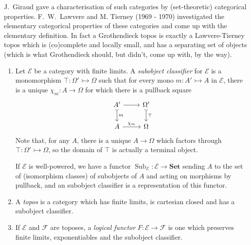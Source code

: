\documentclass[a4paper]{article}
\renewcommand{\c}[1]{\mathbf{#1}}
\newcommand{\Set}{{\c{Set}}}
\newcommand{\mono}{\rightarrowtail}
\begin{document}
J.\ Giraud gave a characterisation of such categories by (set-theoretic) categorical properties. F.\ W.\ Lawvere and M. Tierney (1969 - 1970) investigated the elementary categorical properties of these categories and come up with the elementary definition. In fact a Grothendieck topos is exactly a Lawvere-Tierney topos which is (co)complete and locally small, and has a separating set of objects (which is what Grothendieck should, but didn't, come up with, by the way).

\begin{definition}\leavevmode
  \begin{enumerate}
  \item Let \(\c{\mathcal E}\) be a category with finite limits. A \emph{subobject classifier} for \(\mathcal E\) is a monomorphism \(\top: \Omega' \mono \Omega\) such that for every mono \(m: A' \mono A\) in \(\mathcal E\), there is a unique \(\chi_m: A \to \Omega\) for which there is a pullback square
    \[
      \begin{tikzcd}
        A' \ar[r] \ar[d, "m", tail] & \Omega' \ar[d, "\top", tail] \\
        A \ar[r, "\chi_m"] & \Omega
      \end{tikzcd}
    \]
    Note that, for any \(A\), there is a unique \(A \to \Omega\) which factors through \(\top: \Omega' \mono \Omega\), so the domain of \(\top\) is actually a terminal object.

    If \(\mathcal E\) is well-powered, we have a functor \(\operatorname{Sub}_{\c{\mathcal E}}: \c{\mathcal E} \to \Set\) sending \(A\) to the set of (isomorphism classes) of subobjects of \(A\) and acting on morphisms by pullback, and an subobject classifier is a representation of this functor.
  \item A \emph{topos} is a category which has finite limits, is cartesian closed and has a subobject classifier.
  \item If \(\c{\mathcal E}\) and \(\c{\mathcal F}\) are toposes, a \emph{logical functor} \(F: \c{\mathcal E} \to \c{\mathcal F}\) is one which preserves finite limits, exponentiables and the subobject classifier.
  \end{enumerate}
\end{definition}
\end{document}
